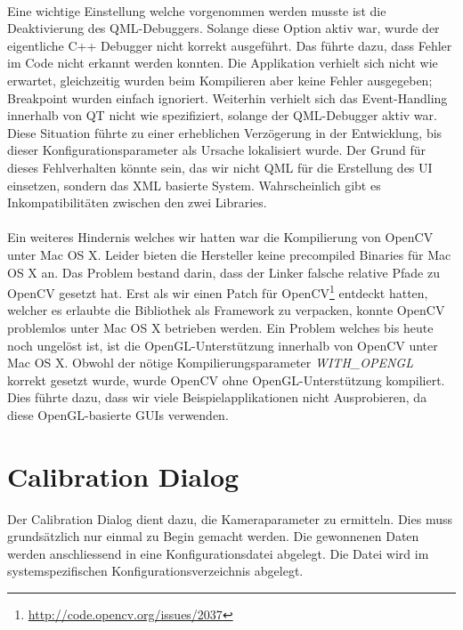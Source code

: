\paragraph{}
Eine wichtige Einstellung welche vorgenommen werden musste ist die Deaktivierung des QML-Debuggers. Solange diese Option aktiv war, wurde der eigentliche C++ Debugger nicht korrekt ausgeführt. Das führte dazu, dass Fehler im Code nicht erkannt werden konnten. Die Applikation verhielt sich nicht wie erwartet, gleichzeitig wurden beim Kompilieren aber keine Fehler ausgegeben; Breakpoint wurden einfach ignoriert. Weiterhin verhielt sich das Event-Handling innerhalb von QT nicht wie spezifiziert, solange der QML-Debugger aktiv war. Diese Situation führte zu einer erheblichen Verzögerung in der Entwicklung, bis dieser Konfigurationsparameter als Ursache lokalisiert wurde. Der Grund für dieses Fehlverhalten könnte sein, das wir nicht QML für die Erstellung des UI einsetzen, sondern das XML basierte System. Wahrscheinlich gibt es Inkompatibilitäten zwischen den zwei Libraries.
\paragraph{}
Ein weiteres Hindernis welches wir hatten war die Kompilierung von OpenCV unter Mac OS X. Leider bieten die Hersteller keine precompiled Binaries für Mac OS X an. Das Problem bestand darin, dass der Linker falsche relative Pfade zu OpenCV gesetzt hat. Erst als wir einen Patch für OpenCV\footnote{\url{http://code.opencv.org/issues/2037}} entdeckt hatten, welcher es erlaubte die Bibliothek als Framework zu verpacken, konnte OpenCV problemlos unter Mac OS X betrieben werden. Ein Problem welches bis heute noch ungelöst ist, ist die OpenGL-Unterstützung innerhalb von OpenCV unter Mac OS X. Obwohl der nötige Kompilierungsparameter \textit{WITH\_OPENGL} korrekt gesetzt wurde, wurde OpenCV ohne OpenGL-Unterstützung kompiliert. Dies führte dazu, dass wir viele Beispielapplikationen nicht Ausprobieren, da diese OpenGL-basierte GUIs verwenden.

\section{Calibration Dialog}
Der Calibration Dialog dient dazu, die Kameraparameter zu ermitteln. Dies muss grundsätzlich nur einmal zu Begin gemacht werden. Die gewonnenen Daten werden anschliessend in eine Konfigurationsdatei abgelegt. Die Datei wird im systemspezifischen Konfigurationsverzeichnis abgelegt.


